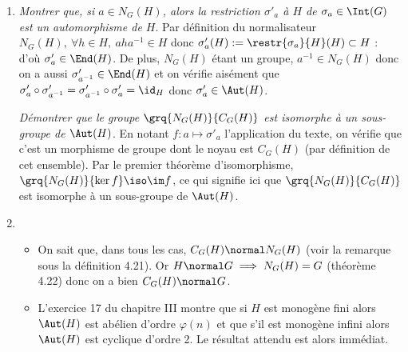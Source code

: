 
\begin{enumerate}
    \item \emph{Montrer que, si $a\in N_G(H)$, alors la restriction $\sigma'_a$ à $H$ de $\sigma_a \in \Int(G)$ est un automorphisme de $H$}. Par définition du normalisateur $N_G(H),~ \forall h\in H,~ aha^{-1}\in H$ donc $\sigma'_a(H):=\restr{\sigma_a}{H}(H)\subset H$ : d'où $\sigma'_a\in \End(H)$. De plus, $N_G(H)$ étant un groupe, $a^{-1}\in N_G(H)$ donc on a aussi $\sigma'_{a^{-1}}\in \End(H)$ et on vérifie aisément que $\sigma'_a\circ \sigma'_{a^{-1}} =  \sigma'_{a^{-1}}\circ\sigma'_a = \id_{H}$ donc $\sigma'_a\in \Aut(H)$.

    \emph{Démontrer que le groupe $\grq{N_G(H)}{C_G(H)}$ est isomorphe à un sous-groupe de $\Aut(H)$}. En notant $f\colon a\mapsto \sigma'_a$ l'application du texte, on vérifie que c'est un morphisme de groupe dont le noyau est $C_G(H)$ (par définition de cet ensemble). Par le premier théorème d'isomorphisme, $\grq{N_G(H)}{\ker f}\iso \im f$, ce qui signifie ici que $\grq{N_G(H)}{C_G(H)}$ est isomorphe à un sous-groupe de $\Aut(H)$.

    \item
    \begin{itemize}
     \item On sait que, dans tous les cas, $C_G(H)\normal N_G(H)$ (voir la remarque sous la définition 4.21). Or $H\normal G \implies N_G(H) = G$ (théorème 4.22) donc on a bien $C_G(H)\normal G$.
     \item L'exercice 17 du chapitre III montre que si $H$ est monogène fini alors $\Aut(H)$ est abélien d'ordre $\varphi(n)$ et que s'il est monogène infini alors $\Aut(H)$ est cyclique d'ordre 2. Le résultat attendu est alors immédiat.
    \end{itemize}




\end{enumerate}
